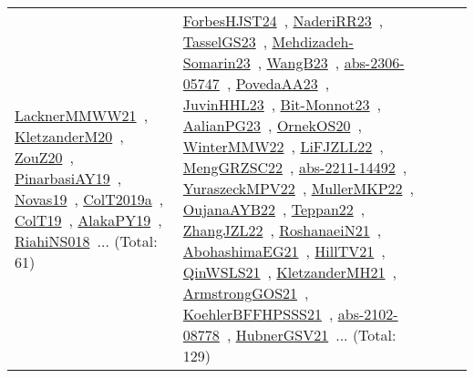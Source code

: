 {\begin{longtable}{lp{3cm}>{\raggedright\arraybackslash}p{6cm}>{\raggedright\arraybackslash}p{6cm}>{\raggedright\arraybackslash}p{8cm}}
\href{../works/LacknerMMWW21.pdf}{LacknerMMWW21}~\cite{LacknerMMWW21}, \href{../works/KletzanderM20.pdf}{KletzanderM20}~\cite{KletzanderM20}, \href{../works/ZouZ20.pdf}{ZouZ20}~\cite{ZouZ20}, \href{../works/PinarbasiAY19.pdf}{PinarbasiAY19}~\cite{PinarbasiAY19}, \href{../works/Novas19.pdf}{Novas19}~\cite{Novas19}, \href{../works/ColT2019a.pdf}{ColT2019a}~\cite{ColT2019a}, \href{../works/ColT19.pdf}{ColT19}~\cite{ColT19}, \href{../works/AlakaPY19.pdf}{AlakaPY19}~\cite{AlakaPY19}, \href{../works/RiahiNS018.pdf}{RiahiNS018}~\cite{RiahiNS018}... (Total: 61) & \href{../works/ForbesHJST24.pdf}{ForbesHJST24}~\cite{ForbesHJST24}, \href{../works/NaderiRR23.pdf}{NaderiRR23}~\cite{NaderiRR23}, \href{../works/TasselGS23.pdf}{TasselGS23}~\cite{TasselGS23}, \href{../works/Mehdizadeh-Somarin23.pdf}{Mehdizadeh-Somarin23}~\cite{Mehdizadeh-Somarin23}, \href{../works/WangB23.pdf}{WangB23}~\cite{WangB23}, \href{../works/abs-2306-05747.pdf}{abs-2306-05747}~\cite{abs-2306-05747}, \href{../works/PovedaAA23.pdf}{PovedaAA23}~\cite{PovedaAA23}, \href{../works/JuvinHHL23.pdf}{JuvinHHL23}~\cite{JuvinHHL23}, \href{../works/Bit-Monnot23.pdf}{Bit-Monnot23}~\cite{Bit-Monnot23}, \href{../works/AalianPG23.pdf}{AalianPG23}~\cite{AalianPG23}, \href{../works/OrnekOS20.pdf}{OrnekOS20}~\cite{OrnekOS20}, \href{../works/WinterMMW22.pdf}{WinterMMW22}~\cite{WinterMMW22}, \href{../works/LiFJZLL22.pdf}{LiFJZLL22}~\cite{LiFJZLL22}, \href{../works/MengGRZSC22.pdf}{MengGRZSC22}~\cite{MengGRZSC22}, \href{../works/abs-2211-14492.pdf}{abs-2211-14492}~\cite{abs-2211-14492}, \href{../works/YuraszeckMPV22.pdf}{YuraszeckMPV22}~\cite{YuraszeckMPV22}, \href{../works/MullerMKP22.pdf}{MullerMKP22}~\cite{MullerMKP22}, \href{../works/OujanaAYB22.pdf}{OujanaAYB22}~\cite{OujanaAYB22}, \href{../works/Teppan22.pdf}{Teppan22}~\cite{Teppan22}, \href{../works/ZhangJZL22.pdf}{ZhangJZL22}~\cite{ZhangJZL22}, \href{../works/RoshanaeiN21.pdf}{RoshanaeiN21}~\cite{RoshanaeiN21}, \href{../works/AbohashimaEG21.pdf}{AbohashimaEG21}~\cite{AbohashimaEG21}, \href{../works/HillTV21.pdf}{HillTV21}~\cite{HillTV21}, \href{../works/QinWSLS21.pdf}{QinWSLS21}~\cite{QinWSLS21}, \href{../works/KletzanderMH21.pdf}{KletzanderMH21}~\cite{KletzanderMH21}, \href{../works/ArmstrongGOS21.pdf}{ArmstrongGOS21}~\cite{ArmstrongGOS21}, \href{../works/KoehlerBFFHPSSS21.pdf}{KoehlerBFFHPSSS21}~\cite{KoehlerBFFHPSSS21}, \href{../works/abs-2102-08778.pdf}{abs-2102-08778}~\cite{abs-2102-08778}, \href{../works/HubnerGSV21.pdf}{HubnerGSV21}~\cite{HubnerGSV21}... (Total: 129)\\

\end{longtable}}
